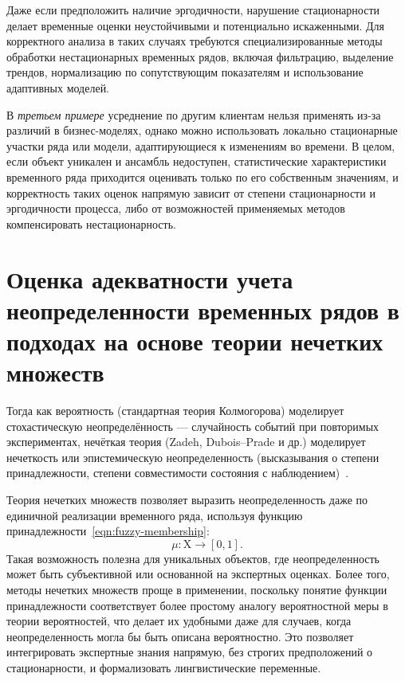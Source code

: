 Даже если предположить наличие эргодичности, нарушение стационарности делает временные оценки неустойчивыми и потенциально искаженными. Для корректного анализа в таких случаях требуются специализированные методы обработки нестационарных временных рядов, включая фильтрацию, выделение трендов, нормализацию по сопутствующим показателям и использование адаптивных моделей.

В \textit{третьем примере} усреднение по другим клиентам нельзя применять из-за различий в бизнес-моделях, однако можно использовать локально стационарные участки ряда или модели, адаптирующиеся к изменениям во времени. В целом, если объект уникален и ансамбль недоступен, статистические характеристики временного ряда приходится оценивать только по его собственным значениям, и корректность таких оценок напрямую зависит от степени стационарности и эргодичности процесса, либо от возможностей применяемых методов компенсировать нестационарность.

\section{Оценка адекватности учета неопределенности временных рядов в подходах на основе теории нечетких множеств}

Тогда как вероятность (стандартная теория Колмогорова) моделирует стохастическую неопределённость --- случайность событий при повторимых экспериментах, нечёткая теория (Zadeh, Dubois–Prade и др.) моделирует нечеткость или эпистемическую неопределенность (высказывания о степени принадлежности, степени совместимости состояния с наблюдением)~\cite{zadeh1965, DuboisPrade1980FuzzySetsSystems, Zadeh1973OutlineComplexSystems, Zadeh1975LinguisticVariable, Mendel2017, KonyshevaFuzzySets, BorisovFuzzySets, RyzhovFuzzySets}.

Теория нечетких множеств позволяет выразить неопределенность даже по единичной реализации временного ряда, используя функцию принадлежности~\eqref{eqn:fuzzy-membership}:
\begin{equation}
\label{eqn:fuzzy-membership}
\mu: \mathrm{X} \rightarrow [0,1].
\end{equation}
Такая возможность полезна для уникальных объектов, где неопределенность может быть субъективной или основанной на экспертных оценках. Более того, методы нечетких множеств проще в применении, поскольку понятие функции принадлежности соответствует более простому аналогу вероятностной меры в теории вероятностей, что делает их удобными даже для случаев, когда неопределенность могла бы быть описана вероятностно. Это позволяет интегрировать экспертные знания напрямую, без строгих предположений о стационарности, и формализовать лингвистические переменные.


